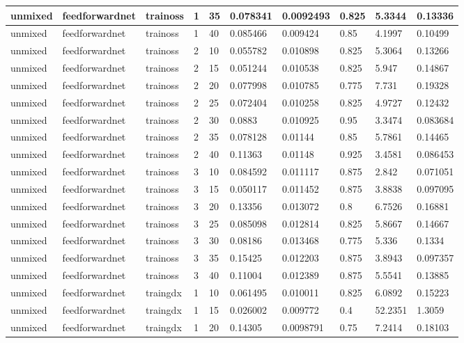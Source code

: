 \begin{longtable}{lllllllll}
unmixed & feedforwardnet & trainoss & 1 & 35 & 0.078341 & 0.0092493 & 0.825 & 5.3344 & 0.13336 \\ \hline 
unmixed & feedforwardnet & trainoss & 1 & 40 & 0.085466 & 0.009424 & 0.85 & 4.1997 & 0.10499 \\ \hline 
unmixed & feedforwardnet & trainoss & 2 & 10 & 0.055782 & 0.010898 & 0.825 & 5.3064 & 0.13266 \\ \hline 
unmixed & feedforwardnet & trainoss & 2 & 15 & 0.051244 & 0.010538 & 0.825 & 5.947 & 0.14867 \\ \hline 
unmixed & feedforwardnet & trainoss & 2 & 20 & 0.077998 & 0.010785 & 0.775 & 7.731 & 0.19328 \\ \hline 
unmixed & feedforwardnet & trainoss & 2 & 25 & 0.072404 & 0.010258 & 0.825 & 4.9727 & 0.12432 \\ \hline 
unmixed & feedforwardnet & trainoss & 2 & 30 & 0.0883 & 0.010925 & 0.95 & 3.3474 & 0.083684 \\ \hline 
unmixed & feedforwardnet & trainoss & 2 & 35 & 0.078128 & 0.01144 & 0.85 & 5.7861 & 0.14465 \\ \hline 
unmixed & feedforwardnet & trainoss & 2 & 40 & 0.11363 & 0.01148 & 0.925 & 3.4581 & 0.086453 \\ \hline 
unmixed & feedforwardnet & trainoss & 3 & 10 & 0.084592 & 0.011117 & 0.875 & 2.842 & 0.071051 \\ \hline 
unmixed & feedforwardnet & trainoss & 3 & 15 & 0.050117 & 0.011452 & 0.875 & 3.8838 & 0.097095 \\ \hline 
unmixed & feedforwardnet & trainoss & 3 & 20 & 0.13356 & 0.013072 & 0.8 & 6.7526 & 0.16881 \\ \hline 
unmixed & feedforwardnet & trainoss & 3 & 25 & 0.085098 & 0.012814 & 0.825 & 5.8667 & 0.14667 \\ \hline 
unmixed & feedforwardnet & trainoss & 3 & 30 & 0.08186 & 0.013468 & 0.775 & 5.336 & 0.1334 \\ \hline 
unmixed & feedforwardnet & trainoss & 3 & 35 & 0.15425 & 0.012203 & 0.875 & 3.8943 & 0.097357 \\ \hline 
unmixed & feedforwardnet & trainoss & 3 & 40 & 0.11004 & 0.012389 & 0.875 & 5.5541 & 0.13885 \\ \hline 
unmixed & feedforwardnet & traingdx & 1 & 10 & 0.061495 & 0.010011 & 0.825 & 6.0892 & 0.15223 \\ \hline 
unmixed & feedforwardnet & traingdx & 1 & 15 & 0.026002 & 0.009772 & 0.4 & 52.2351 & 1.3059 \\ \hline 
unmixed & feedforwardnet & traingdx & 1 & 20 & 0.14305 & 0.0098791 & 0.75 & 7.2414 & 0.18103 \\ \hline 

\end{longtable}
